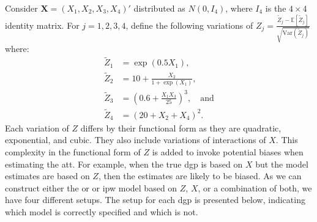 Consider $\mathbf{X} = (X_1, X_2, X_3, X_4)'$ distributed as $N(0, I_4)$, where $I_4$ is the $4 \times 4$ identity matrix.
For $j = 1, 2, 3, 4$, \citet{kang2007demystifying} define the following variations of $Z_j = \frac{\tilde{Z}_j - \mathbb{E}[\tilde{Z}_j]}{\sqrt{\text{Var}(\tilde{Z}_j)}}$ where:
\begin{align} \nonumber
\tilde{Z}_1 &= \exp(0.5X_1), \\ \nonumber
\tilde{Z}_2 &= 10 + \frac{X_2}{1 + \exp(X_1)}, \\
\tilde{Z}_3 &= (0.6 + \frac{X_1 X_3}{25})^3, \quad \text{and} \\ \nonumber
\tilde{Z}_4 &= (20 + X_2 + X_4)^2.  \nonumber
\label{eq:13}
\end{align}
Each variation of $Z$ differs by their functional form as they are quadratic, exponential, and cubic.
They also include variations of interactions of $X$.
This complexity in the functional form of $Z$ is added to invoke potential biases when estimating the \ac{att}.
For example, when the true \ac{dgp} is based on $X$ but the model estimates are based on $Z$, then the estimates are likely to be biased.
As we can construct either the \ac{or} or \ac{ipw} model based on $Z$, $X$, or a combination of both, we have four different setups.
The setup for each \ac{dgp} is presented below, indicating which model is correctly specified and which is not.
